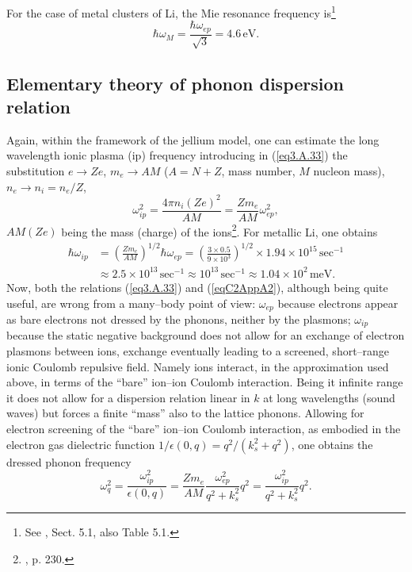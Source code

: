 \begin{subappendices}
For the case of metal clusters of Li, the Mie resonance frequency is\footnote{See \cite{Bertsch:05}, Sect. 5.1, also Table 5.1.}
\begin{equation}
\hbar\omega_M=\frac{\hbar\omega_{ep}}{\sqrt{3}}=4.6\,\text{eV}.
\end{equation}
\subsection{Elementary theory of phonon dispersion relation}\label{App3A3}
Again, within the framework of the jellium model, one can estimate the long wavelength ionic plasma (ip) frequency introducing in (\ref{eq3.A.33})  the substitution $e\rightarrow Ze$, $m_e\rightarrow AM$ ($A=N+Z$, mass number, $M$ nucleon mass), $n_e\rightarrow n_i=n_e/Z$,
\begin{equation}\label{eqC2AppA2}
\omega_{ip}^2=\frac{4\pi n_i(Ze)^2}{AM}=\frac{Zm_e}{AM}\omega_{ep}^2,
\end{equation}
$AM (Ze)$ being the mass (charge) of the ions\footnote{\cite{Ketterson:99}, p. 230.}.
For metallic Li, one obtains
\begin{align}
\nonumber\hbar\omega_{ip}&=\left(\frac{Zm_e}{AM}\right)^{1/2}\hbar\omega_{ep}=\left(\frac{3\times0.5}{9\times10^3}\right)^{1/2}\times1.94\times 10^{15}\,\text{sec}^{-1}\\
&\approx2.5\times10^{13}\,\text{sec}^{-1}\approx10^{13}\,\text{sec}^{-1}\approx1.04\times10^2\,\text{meV}.
\end{align}
Now, both  the  relations (\ref{eq3.A.33}) and (\ref{eqC2AppA2}), although being quite useful, are wrong from a many--body point of view: $\omega_{ep}$ because electrons appear as bare electrons not dressed by the phonons, neither by the plasmons; $\omega_{ip}$ because the  static negative background does not allow for an exchange of electron plasmons between ions, exchange eventually leading to a screened, short--range ionic Coulomb repulsive field. Namely ions interact, in the approximation used above, in terms of the ``bare'' ion--ion Coulomb interaction. Being it infinite range it does not allow for a dispersion relation linear in $k$ at long wavelengths (sound waves) but forces a finite ``mass'' also to the lattice phonons. Allowing for electron screening of the ``bare'' ion--ion Coulomb interaction, as embodied in the electron gas dielectric function $1/\epsilon(0,q)=q^2/(k_s^2+q^2)$, one obtains the dressed phonon frequency
\begin{equation}\label{eqC2AppA3}
\omega_q^2=\frac{\omega_{ip}^2}{\epsilon(0,q)}=\frac{Zm_e}{AM}\frac{\omega_{ep}^2}{q^2+k_s^2}q^2=\frac{\omega_{ip}^2}{q^2+k_s^2}q^2.

\end{equation}
\end{subappendices}
